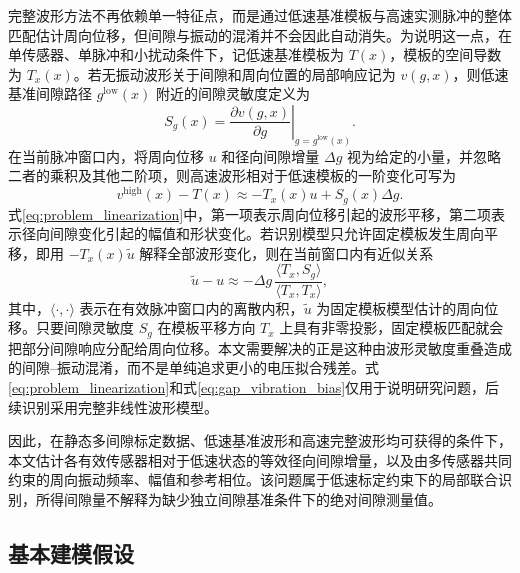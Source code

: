\documentclass[UTF8,12pt,a4paper]{ctexart}
\begin{document}
完整波形方法不再依赖单一特征点，而是通过低速基准模板与高速实测脉冲的整体匹配估计周向位移，但间隙与振动的混淆并不会因此自动消失。为说明这一点，在单传感器、单脉冲和小扰动条件下，记低速基准模板为 $T(x)$，模板的空间导数为 $T_x(x)$。若无振动波形关于间隙和周向位置的局部响应记为 $v(g,x)$，则低速基准间隙路径 $g^{\mathrm{low}}(x)$ 附近的间隙灵敏度定义为
\begin{equation}
S_g(x)=
\left.
\frac{\partial v(g,x)}{\partial g}
\right|_{g=g^{\mathrm{low}}(x)}.
\label{eq:problem_gap_sensitivity}
\end{equation}
在当前脉冲窗口内，将周向位移 $u$ 和径向间隙增量 $\Delta g$ 视为给定的小量，并忽略二者的乘积及其他二阶项，则高速波形相对于低速模板的一阶变化可写为
\begin{equation}
v^{\mathrm{high}}(x)-T(x)
\approx -T_x(x)u+S_g(x)\Delta g.
\label{eq:problem_linearization}
\end{equation}
式\eqref{eq:problem_linearization}中，第一项表示周向位移引起的波形平移，第二项表示径向间隙变化引起的幅值和形状变化。若识别模型只允许固定模板发生周向平移，即用 $-T_x(x)\widetilde u$ 解释全部波形变化，则在当前窗口内有近似关系
\begin{equation}
\widetilde u-u
\approx
-\Delta g\,
\frac{\langle T_x,S_g\rangle}
{\langle T_x,T_x\rangle},
\label{eq:gap_vibration_bias}
\end{equation}
其中，$\langle\cdot,\cdot\rangle$ 表示在有效脉冲窗口内的离散内积，$\widetilde u$ 为固定模板模型估计的周向位移。只要间隙灵敏度 $S_g$ 在模板平移方向 $T_x$ 上具有非零投影，固定模板匹配就会把部分间隙响应分配给周向位移。本文需要解决的正是这种由波形灵敏度重叠造成的间隙--振动混淆，而不是单纯追求更小的电压拟合残差。式\eqref{eq:problem_linearization}和式\eqref{eq:gap_vibration_bias}仅用于说明研究问题，后续识别采用完整非线性波形模型。

因此，在静态多间隙标定数据、低速基准波形和高速完整波形均可获得的条件下，本文估计各有效传感器相对于低速状态的等效径向间隙增量，以及由多传感器共同约束的周向振动频率、幅值和参考相位。该问题属于低速标定约束下的局部联合识别，所得间隙量不解释为缺少独立间隙基准条件下的绝对间隙测量值。

\subsection{基本建模假设}
\end{document}
